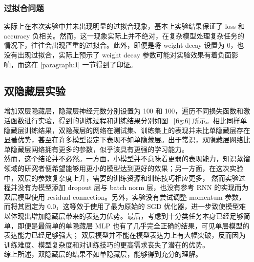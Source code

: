 \documentclass{article}
\begin{document}
\subsubsection{过拟合问题}

实际上在本次实验中并未出现明显的过拟合现象，基本上实验结果保证了 loss 和 accuracy 负相关。然而，这一现象实际上并不绝对，在复杂模型处理复杂任务的情况下，往往会出现严重的过拟合。此外，即便是将 weight decay 设置为 0，也没有出现过拟合，实际上预示了 weight decay 参数可能对实验效果有着负面影响，而这在 \ref{paragraph:1} 一节得到了印证。

\subsection{双隐藏层实验}

增加双层隐藏层，隐藏层神经元数分别设置为 100 和 100，遍历不同损失函数和激活函数进行实验，得到的训练过程和训练结果分别如图 ~\ref{fig:6} 所示。相比同样单隐藏层训练结果，双隐藏层的网络在测试集、训练集上的表现并未比单隐藏层存在显著优势，甚至在许多模型设定下表现不如单隐藏层。出于常识，双隐藏层网络比单隐藏层网络拥有更多的参数，似乎该具有更强的学习能力。\\
然而，这个结论并不必然。一方面，小模型并不意味着更弱的表现能力，知识蒸馏领域的研究者便希望能够用更小的模型达到更好的效果；另一方面，在这次实验中，双层的参数复杂度上升，需要的训练资源和训练技巧相应更多，
然而实验过程并没有为模型添加 dropout 层与 batch norm 层，也没有参考 RNN 的实现而为双层模型使用 residual connection。另外，实验没有尝试调整 momentum 参数，而将其固定为 0.0，这等效于使用了最为原始的 SGD 优化器，进一步致使模型难以体现出增加隐藏层带来的表达力优势。最后，考虑到十分类任务本身已经足够简单，即便是最简单的单隐藏层 MLP 也有了几乎完全正确的结果，可见单层模型的表达能力已经足够强大；
双层模型并不能在模型表达力上有大幅突破，反而因为训练难度、模型复杂度和对训练技巧的更高需求丧失了潜在的优势。\\
综上所述，双隐藏层的结果不如单隐藏层，能够得到充分的理解。
\end{document}
